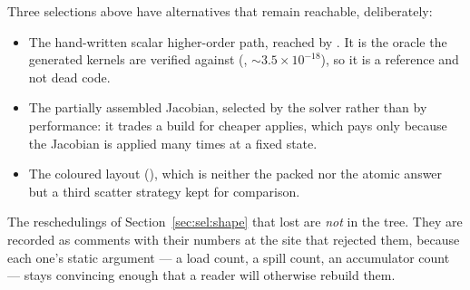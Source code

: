 Three selections above have alternatives that remain reachable, deliberately:

\begin{itemize}
\item The hand-written scalar higher-order path, reached by . It is the oracle
      the generated kernels are verified against
      (, $\sim 3.5\times10^{-18}$), so it is
      a reference and not dead code.
\item The partially assembled Jacobian, selected by the solver rather than by performance: it
      trades a build for cheaper applies, which pays only because the Jacobian is applied many
      times at a fixed state.
\item The coloured layout (), which is neither the packed nor
      the atomic answer but a third scatter strategy kept for comparison.
\end{itemize}

\noindent
The reschedulings of Section~\ref{sec:sel:shape} that lost are \emph{not} in the tree. They are
recorded as comments with their numbers at the site that rejected them, because each one's static
argument --- a load count, a spill count, an accumulator count --- stays convincing enough that a
reader will otherwise rebuild them.
